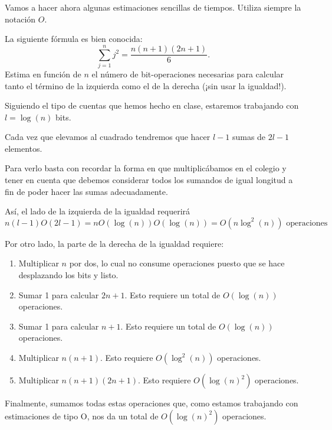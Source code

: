 \vspace{0.2cm}

Vamos a hacer  ahora algunas estimaciones sencillas de tiempos. Utiliza siempre la
notación $O$.

\vspace{0.2cm}

\begin{problem}[9]
La siguiente fórmula es bien conocida:
$$\sum_{j=1}^n j^2=\frac{n(n+1)(2n+1)}{6}.$$
Estima en función de $n$ el número de bit-operaciones necesarias para
calcular tanto el término de la izquierda como el de la derecha (¡sin usar la igualdad!).
\solution


Siguiendo el tipo de cuentas que hemos hecho en clase, estaremos trabajando con $l=\log(n)$ bits.

Cada vez que elevamos al cuadrado tendremos que hacer $l-1$ sumas de $2l-1$ elementos.

\obs Para verlo basta con recordar la forma en que multiplicábamos en el colegio y tener en cuenta que debemos considerar todos los sumandos de igual longitud a fin de poder hacer las sumas adecuadamente.

Así, el lado de la izquierda de la igualdad requerirá
\[n(l-1)O(2l-1)=nO(\log(n))O(\log(n))=O(n\log^2(n)) \text{ operaciones}\]

Por otro lado, la parte de la derecha de la igualdad requiere:
\begin{enumerate}
\item Multiplicar $n$ por dos, lo cual no consume operaciones puesto que se hace desplazando los bits y listo.
\item Sumar 1 para calcular $2n+1$. Esto requiere un total de $O(\log(n))$ operaciones.
\item Sumar 1 para calcular $n+1$. Esto requiere un total de $O(\log(n))$ operaciones.
\item Multiplicar $n(n+1)$. Esto requiere $O(\log^2(n))$ operaciones.
\item Multiplicar $n(n+1)(2n+1)$. Esto requiere $O(\log(n)^2)$ operaciones.
\end{enumerate}

Finalmente, sumamos todas estas operaciones que, como estamos trabajando con estimaciones de tipo O, nos da un total de $O(\log(n)^2)$ operaciones.

\end{problem}


